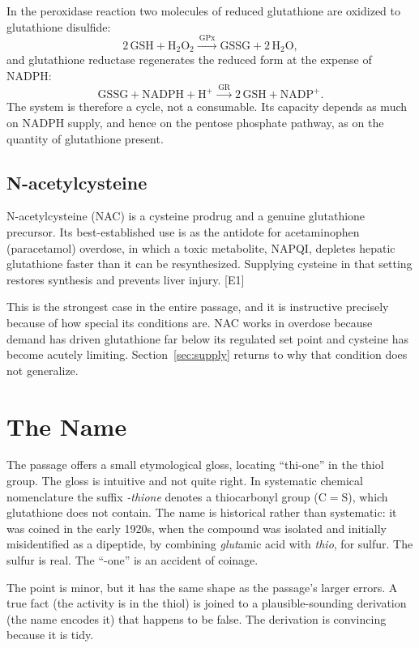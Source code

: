 \documentclass[11pt,a4paper]{article}
\theoremstyle{plain}
\theoremstyle{definition}
\theoremstyle{remark}
\newcommand{\tier}[1]{\textup{\textsc{[#1]}}}
\newcommand{\Eone}{\tier{E1}}
\newcommand{\GSH}{\mathrm{GSH}}
\newcommand{\GSSG}{\mathrm{GSSG}}
\begin{document}
In the peroxidase reaction two molecules of reduced glutathione are oxidized to glutathione disulfide:
\[
2\,\GSH + \mathrm{H_2O_2} \xrightarrow{\ \text{GPx}\ } \GSSG + 2\,\mathrm{H_2O},
\]
and glutathione reductase regenerates the reduced form at the expense of NADPH:
\[
\GSSG + \mathrm{NADPH} + \mathrm{H^+} \xrightarrow{\ \text{GR}\ } 2\,\GSH + \mathrm{NADP^+}.
\]
The system is therefore a cycle, not a consumable. Its capacity depends as much on NADPH supply, and hence on the pentose phosphate pathway, as on the quantity of glutathione present.

\subsection{N-acetylcysteine}

N-acetylcysteine (NAC) is a cysteine prodrug and a genuine glutathione precursor. Its best-established use is as the antidote for acetaminophen (paracetamol) overdose, in which a toxic metabolite, NAPQI, depletes hepatic glutathione faster than it can be resynthesized. Supplying cysteine in that setting restores synthesis and prevents liver injury. \Eone

This is the strongest case in the entire passage, and it is instructive precisely because of how special its conditions are. NAC works in overdose because demand has driven glutathione far below its regulated set point and cysteine has become acutely limiting. Section~\ref{sec:supply} returns to why that condition does not generalize.

\section{The Name}

The passage offers a small etymological gloss, locating ``thi-one'' in the thiol group. The gloss is intuitive and not quite right. In systematic chemical nomenclature the suffix \emph{-thione} denotes a thiocarbonyl group ($\mathrm{C{=}S}$), which glutathione does not contain. The name is historical rather than systematic: it was coined in the early 1920s, when the compound was isolated and initially misidentified as a dipeptide, by combining \emph{glut}amic acid with \emph{thio}, for sulfur. The sulfur is real. The ``-one'' is an accident of coinage.

The point is minor, but it has the same shape as the passage's larger errors. A true fact (the activity is in the thiol) is joined to a plausible-sounding derivation (the name encodes it) that happens to be false. The derivation is convincing because it is tidy.
\end{document}
